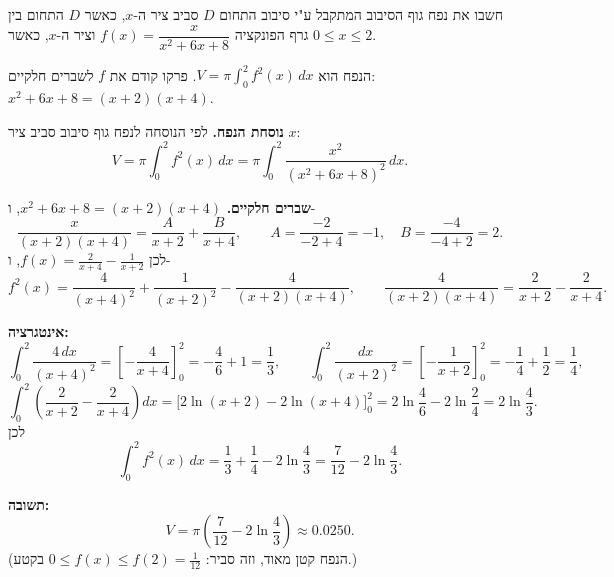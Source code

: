 
\begin{question}
חשבו את נפח גוף הסיבוב המתקבל ע"י סיבוב התחום $D$ סביב ציר ה-$x$, כאשר $D$ התחום בין גרף הפונקציה $f(x)=\dfrac{x}{x^2+6x+8}$ וציר ה-$x$, כאשר $0\le x\le2$.
\end{question}

\begin{hint}
הנפח הוא $V=\pi\int_0^2f^2(x)\,dx$. פרקו קודם את $f$ לשברים חלקיים: $x^2+6x+8=(x+2)(x+4)$.
\end{hint}

\begin{solution}
\textbf{נוסחת הנפח.} לפי הנוסחה לנפח גוף סיבוב סביב ציר $x$:
\[
V=\pi\int_0^2 f^2(x)\,dx=\pi\int_0^2\frac{x^2}{(x^2+6x+8)^2}\,dx.
\]

\textbf{שברים חלקיים.} $x^2+6x+8=(x+2)(x+4)$, ו-
\[
\frac{x}{(x+2)(x+4)}=\frac{A}{x+2}+\frac{B}{x+4},\qquad A=\frac{-2}{-2+4}=-1,\quad B=\frac{-4}{-4+2}=2.
\]
לכן $f(x)=\frac{2}{x+4}-\frac{1}{x+2}$, ו-
\[
f^2(x)=\frac{4}{(x+4)^2}+\frac{1}{(x+2)^2}-\frac{4}{(x+2)(x+4)},\qquad
\frac{4}{(x+2)(x+4)}=\frac{2}{x+2}-\frac{2}{x+4}.
\]

\textbf{אינטגרציה:}
\[
\int_0^2\frac{4\,dx}{(x+4)^2}=\left[-\frac4{x+4}\right]_0^2=-\frac46+1=\frac13,\qquad
\int_0^2\frac{dx}{(x+2)^2}=\left[-\frac1{x+2}\right]_0^2=-\frac14+\frac12=\frac14,
\]
\[
\int_0^2\left(\frac{2}{x+2}-\frac{2}{x+4}\right)dx=\Big[2\ln(x+2)-2\ln(x+4)\Big]_0^2=2\ln\frac46-2\ln\frac24=2\ln\frac43.
\]
לכן
\[
\int_0^2f^2(x)\,dx=\frac13+\frac14-2\ln\frac43=\frac7{12}-2\ln\frac43.
\]

\textbf{תשובה:}
\[
V=\pi\left(\frac{7}{12}-2\ln\frac43\right)\approx0.0250.
\]
(הנפח קטן מאוד, וזה סביר: $0\le f(x)\le f(2)=\frac1{12}$ בקטע.)
\end{solution}
